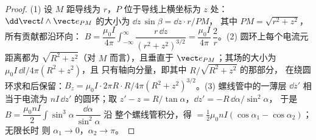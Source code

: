 \begin{proof}
(1) 设 $M$ 距导线为 $r$，$P$ 位于导线上横坐标为 $z$ 处：
$\dd\vect l\wedge\vect e_{PM}$ 的大小为 $\dd z\,\sin\beta = \dd z\cdot r/PM$，
其中 $PM = \sqrt{r^2 + z^2}$，所有贡献都沿环向：
$B = \dfrac{\mu_0I}{4\pi}\displaystyle\int_{-\infty}^{\infty}\dfrac{r\,\dd z}{(r^2 + z^2)^{3/2}}
= \dfrac{\mu_0I}{4\pi}\,\dfrac{2}{r}$。(2) 圆环上每个电流元
距离都为 $\sqrt{R^2 + z^2}$（对 $M$ 而言），且垂直于
$\vect e_{PM}$；其场的大小为 $\mu_0I\,\dd l/4\pi(R^2 + z^2)$，且
只有轴向分量，即其中 $R/\sqrt{R^2 + z^2}$ 的那部分，
在绕圆环求和后保留：$B_z = \mu_0I\cdot2\pi R\cdot R/4\pi(R^2 +
z^2)^{3/2}$。(3) 螺线管中的一薄层 $\dd z'$ 相当于电流为
$nI\,\dd z'$ 的圆环；取 $z' - z = R/\tan\alpha$，$\dd z' = -R\,\dd\alpha/\sin^2\alpha$，
于是 $B = \dfrac{\mu_0nI}{2}\displaystyle\int\sin^3\alpha\,\dfrac{\dd\alpha}{\sin^2\alpha}$ 沿
整个螺线管积分，得 $= \tfrac12\mu_0nI(\cos\alpha_1 - \cos\alpha_2)$；无限长时
则 $\alpha_1 \to 0$，$\alpha_2 \to \pi$。
\end{proof}

